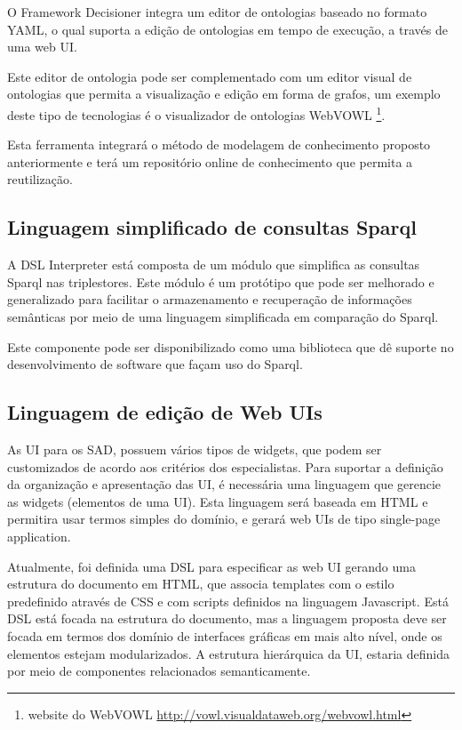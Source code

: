 O Framework Decisioner integra um editor de ontologias baseado no
formato \foreignlanguage{english}{YAML}, o qual suporta a edição de
ontologias em tempo de execução, a través de uma web UI.

Este editor de ontologia pode ser complementado com um editor visual
de ontologias que permita a visualização e edição em forma de grafos,
um exemplo deste tipo de tecnologias é o visualizador de ontologias
WebVOWL \footnote{%
website do WebVOWL\foreignlanguage{brazil}{ \url{http://vowl.visualdataweb.org/webvowl.html}}%
}. 

Esta ferramenta integrará o método de modelagem de conhecimento proposto
anteriormente e terá um repositório online de conhecimento que permita
a reutilização.

\subsection*{Linguagem simplificado de consultas Sparql}

A \foreignlanguage{english}{DSL Interpreter} está composta de um módulo
que simplifica as consultas Sparql nas \foreignlanguage{english}{triplestores}.
Este módulo é um protótipo que pode ser melhorado e generalizado para
facilitar o armazenamento e recuperação de informações semânticas
por meio de uma linguagem simplificada em comparação do Sparql. 

Este componente pode ser disponibilizado como uma biblioteca que dê
suporte no desenvolvimento de software que façam uso do Sparql. 

\subsection*{Linguagem de edição de \foreignlanguage{english}{Web UIs}}

As \foreignlanguage{english}{UI} para os SAD, possuem vários tipos
de \foreignlanguage{english}{widgets}, que podem ser customizados
de acordo aos critérios dos especialistas. Para suportar a definição
da organização e apresentação das UI, é necessária uma linguagem que
gerencie as \foreignlanguage{english}{widgets} (elementos de uma \foreignlanguage{english}{UI}).
Esta linguagem será baseada em \foreignlanguage{english}{HTML} e permitira
usar termos simples do domínio, e gerará web UIs de tipo single-page
application.

Atualmente, foi definida uma DSL para especificar as web UI gerando
uma estrutura do documento em \foreignlanguage{english}{HTML}, que
associa \foreignlanguage{english}{templates} com o estilo predefinido
através de \foreignlanguage{english}{CSS} e com \foreignlanguage{english}{scripts}
definidos na linguagem \foreignlanguage{english}{Javascript}. Está
DSL está focada na estrutura do documento, mas a linguagem proposta
deve ser focada em termos dos domínio de interfaces gráficas em mais
alto nível, onde os elementos estejam modularizados. A estrutura hierárquica
da UI, estaria definida por meio de componentes relacionados semanticamente.

